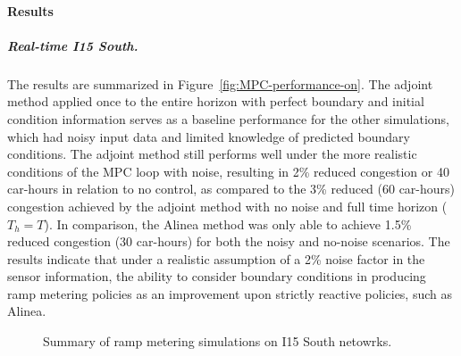								\paragraph{Results}
																
								\subparagraph{Real-time I15 South.}
																
								The results are summarized in Figure~\ref{fig:MPC-performance-on}.
								The adjoint method applied once to the entire horizon with perfect
								boundary and initial condition information serves as a baseline performance
								for the other simulations, which had noisy input data and limited
								knowledge of predicted boundary conditions. The adjoint method still
								performs well under the more realistic conditions of the MPC loop
								with noise, resulting in 2\% reduced congestion or 40 car-hours in relation to no control, as compared to the 3\% reduced (60 car-hours) congestion achieved by the adjoint method with no noise and full time horizon ($T_h=T$). In comparison, the Alinea method was only able to achieve 1.5\% reduced congestion (30 car-hours) for both the noisy and no-noise scenarios. The results indicate
								that under a realistic assumption of a 2\% noise factor in the sensor
								information, the ability to consider boundary conditions in producing
								ramp metering policies as an improvement upon strictly reactive policies,
								such as Alinea.
																
								\begin{figure}
									\hfill{}
									\caption{Summary of ramp metering simulations on I15 South netowrks.}
								\end{figure}
																
